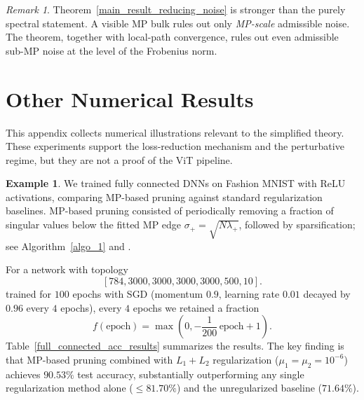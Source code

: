 \documentclass[11pt]{article}
\theoremstyle{plain}
\theoremstyle{definition}
\newtheorem{ex}[thm]{Example}
\theoremstyle{remark}
\newtheorem{rem}[thm]{Remark}
\newcommand{\1}{\mathbf{1}}
\begin{document}
\begin{rem}
Theorem~\ref{main_result_reducing_noise} is stronger than the purely spectral statement. A visible MP bulk rules out only \emph{MP-scale} admissible noise. The theorem, together with local-path convergence, rules out even admissible sub-MP noise at the level of the Frobenius norm.
\end{rem}



\section{Other Numerical Results}
\label{app:fc_num}

This appendix collects numerical illustrations relevant to the simplified theory. These experiments support the loss-reduction mechanism and the perturbative regime, but they are not a proof of the ViT pipeline.

\begin{ex}
\label{higher_acc_MP_based_training}
We trained fully connected DNNs on Fashion MNIST with ReLU activations, comparing MP-based pruning against standard regularization baselines. MP-based pruning consisted of periodically removing a fraction of singular values below the fitted MP edge \(\sigma_+=\sqrt{N\lambda_+}\), followed by sparsification; see Algorithm~\ref{algo_1} and \cite{shmalo2023deep,berlyand2023enhancing}.

For a network with topology
\[
[784,3000,3000,3000,3000,500,10].
\]
trained for \(100\) epochs with SGD (momentum \(0.9\), learning rate \(0.01\) decayed by \(0.96\) every \(4\) epochs), every \(4\) epochs we retained a fraction
\begin{equation}
\label{slow_prune}
f(\mathrm{epoch})=\max\left(0,-\frac1{200}\,\mathrm{epoch}+1\right).
\end{equation}
Table~\ref{full_connected_acc_results} summarizes the results. The key finding is that MP-based pruning combined with \(L_1+L_2\) regularization (\(\mu_1=\mu_2=10^{-6}\)) achieves \(90.53\%\) test accuracy, substantially outperforming any single regularization method alone (\(\le 81.70\%\)) and the unregularized baseline (\(71.64\%\)).
\end{ex}
\end{document}
